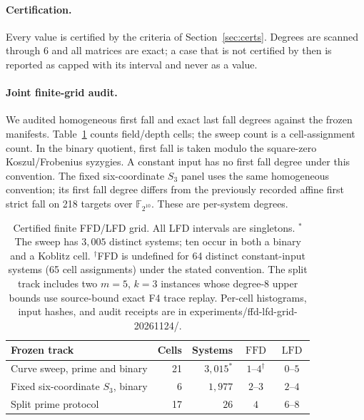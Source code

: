 \documentclass[11pt]{article}
\theoremstyle{definition}\newtheorem{definition}[theorem]{Definition}
\theoremstyle{remark}\newtheorem{remark}[theorem]{Remark}
\newcommand{\F}{\mathbb F}
\newcommand{\lfd}{\operatorname{LFD}}
\newcommand{\ffd}{\operatorname{FFD}}
\newcommand{\codeus}{\textunderscore\allowbreak}
\newcommand{\code}[1]{{\ttfamily\let\_\codeus#1}}
\begin{document}
\paragraph{Certification.} Every value is certified by the criteria of
Section~\ref{sec:certs}. Degrees are scanned through $6$ and all matrices
are exact; a case that is not certified by then is reported as capped with
its interval and never as a value.

\SWEEPRESULTS

\paragraph{Joint finite-grid audit.}
We audited homogeneous first fall and exact last fall degrees against the
frozen manifests. Table~\ref{tab:ffdlfdgrid} counts field/depth cells;
the sweep count is a cell-assignment count. In the binary quotient, first
fall is taken modulo the square-zero Koszul/Frobenius syzygies. A constant
input has no first fall degree under this convention. The fixed
six-coordinate $S_3$ panel uses the same homogeneous convention; its first
fall degree differs from the previously recorded affine first strict fall
on 218 targets over $\F_{2^{10}}$. These are per-system degrees.

\begin{table}[htbp]
\centering\small
\begin{tabular}{@{}lrrcc@{}}
\toprule
Frozen track & Cells & Systems & $\ffd$ & $\lfd$\\
\midrule
Curve sweep, prime and binary & 21 & $3{,}015^{*}$ & $1$--$4^{\dagger}$ & $0$--$5$\\
Fixed six-coordinate $S_3$, binary & 6 & $1{,}977$ & $2$--$3$ & $2$--$4$\\
Split prime protocol & 17 & $26$ & $4$ & $6$--$8$\\
\bottomrule
\end{tabular}
\caption{Certified finite FFD/LFD grid. All LFD intervals are singletons.
$^{*}$The sweep has $3{,}005$ distinct systems; ten occur in both a binary
and a Koblitz cell. $^{\dagger}$FFD is undefined for 64 distinct
constant-input systems (65 cell assignments) under the stated convention.
The split track includes two $m=5$, $k=3$ instances whose degree-$8$
upper bounds use source-bound exact F4 trace replay. Per-cell histograms,
input hashes, and audit receipts are in
\code{experiments/ffd-lfd-grid-20261124/}.}
\label{tab:ffdlfdgrid}
\end{table}
\end{document}
